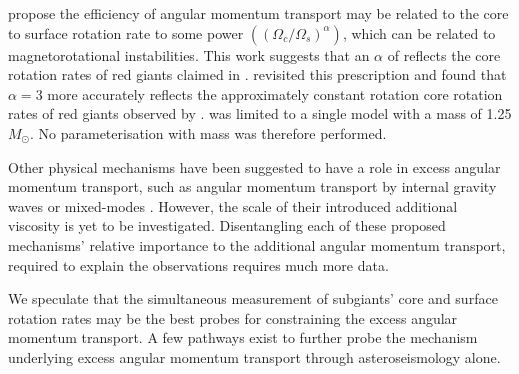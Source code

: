 \citet{spada_angular_2016} propose the efficiency of angular momentum transport may be related to the core to surface rotation rate to some power $\left(\left(\Omega_c/\Omega_s\right)^{\alpha}\right)$, which can be related to magnetorotational instabilities.
This work suggests that an $\alpha$ of reflects the core rotation rates of red giants claimed in \citet{mosser_spin_2012}.
\citet{moyano_asteroseismology_2022} revisited this prescription and found that $\alpha = 3$ more accurately reflects the approximately constant rotation core rotation rates of red giants observed by \citet{gehan_core_2018}.
\citet{spada_angular_2016} was limited to a single model with a mass of 1.25 $M_{\odot}$.
No parameterisation with mass was therefore performed.

Other physical mechanisms have been suggested to have a role in excess angular momentum transport, such as angular momentum transport by internal gravity waves \citep{pincon_can_2017} or mixed-modes \citep{belkacem_angular_2015}. 
However, the scale of their introduced additional viscosity is yet to be investigated.
Disentangling each of these proposed mechanisms' relative importance to the additional angular momentum transport, required to explain the observations requires much more data.



We speculate that the simultaneous measurement of subgiants' core and surface rotation rates may be the best probes for constraining the excess angular momentum transport.
A few pathways exist to further probe the mechanism underlying excess angular momentum transport through asteroseismology alone.

